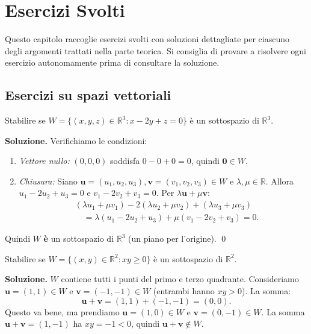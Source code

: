\chapter{Esercizi Svolti}
\label{ch:esercizi}

Questo capitolo raccoglie esercizi svolti con soluzioni dettagliate per ciascuno degli argomenti trattati nella parte teorica. Si consiglia di provare a risolvere ogni esercizio autonomamente prima di consultare la soluzione.

\section{Esercizi su spazi vettoriali}
\label{sec:es-spazi}

\begin{examplebox}
Stabilire se $W = \{(x, y, z) \in \mathbb{R}^3 : x - 2y + z = 0\}$ è un sottospazio di $\mathbb{R}^3$.
\end{examplebox}

\textbf{Soluzione.} Verifichiamo le condizioni:
\begin{enumerate}
    \item \textit{Vettore nullo:} $(0, 0, 0)$ soddisfa $0 - 0 + 0 = 0$, quindi $\mathbf{0} \in W$.
    \item \textit{Chiusura:} Siano $\mathbf{u} = (u_1, u_2, u_3), \mathbf{v} = (v_1, v_2, v_3) \in W$ e $\lambda, \mu \in \mathbb{R}$. Allora $u_1 - 2u_2 + u_3 = 0$ e $v_1 - 2v_2 + v_3 = 0$. Per $\lambda\mathbf{u} + \mu\mathbf{v}$:
    \begin{align*}
    &(\lambda u_1{+}\mu v_1) - 2(\lambda u_2{+}\mu v_2) + (\lambda u_3{+}\mu v_3) \\
    &\quad = \lambda(u_1{-}2u_2{+}u_3) + \mu(v_1{-}2v_2{+}v_3) = 0.
    \end{align*}
\end{enumerate}
Quindi $W$ \textbf{è} un sottospazio di $\mathbb{R}^3$ (un piano per l'origine). \qed

\medskip

\begin{examplebox}
Stabilire se $W = \{(x, y) \in \mathbb{R}^2 : xy \geq 0\}$ è un sottospazio di $\mathbb{R}^2$.
\end{examplebox}

\textbf{Soluzione.} $W$ contiene tutti i punti del primo e terzo quadrante. Consideriamo $\mathbf{u} = (1, 1) \in W$ e $\mathbf{v} = (-1, -1) \in W$ (entrambi hanno $xy > 0$). La somma:
\[ \mathbf{u} + \mathbf{v} = (1, 1) + (-1, -1) = (0, 0). \]
Questo va bene, ma prendiamo $\mathbf{u} = (1, 0) \in W$ e $\mathbf{v} = (0, -1) \in W$. La somma $\mathbf{u} + \mathbf{v} = (1, -1)$ ha $xy = -1 < 0$, quindi $\mathbf{u} + \mathbf{v} \notin W$.

